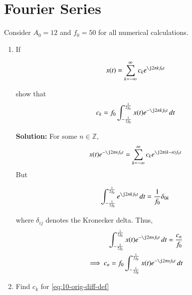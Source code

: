 \documentclass[journal,12pt,twocolumn]{IEEEtran}
\newcommand{\solution}{\noindent \textbf{Solution: }}
\numberwithin{equation}{section}
\numberwithin{figure}{section}
\renewcommand\thesection{\arabic{section}}
\begin{document}
\section{Fourier Series}
Consider $A_0 =12$ and $f_0 = 50$ for all numerical calculations.
\begin{enumerate}[label=\thesection.\arabic*,ref=\thesection.\theenumi]
\item If

\begin{align}
	x(t) = \sum_{k = -\infty}^{\infty}c_ke^{\j2\pi kf_0 t}
\label{eq:one-Z-complex}
\end{align}

show that 
\begin{align}
	c_k = f_0\int_{-\frac{1}{2f_0}}^{\frac{1}{2f_0}}x(t)e^{-\j2\pi kf_0 t}\, dt
\label{eq:one-Z}
\end{align}

\solution For some $n \in \mathbb{Z}$,
\begin{align}
    x(t)e^{-\j2\pi nf_0t} = \sum_{k = -\infty}^{\infty}c_ke^{\j2\pi (k - n)f_0 t}
\end{align}
But

\begin{align}
    \int_{-\frac{1}{2f_0}}^{\frac{1}{2f_0}}e^{\j2\pi kf_0 t}\, dt = 
    \frac{1}{f_0}\delta_{0k}
\end{align}

where $\delta_{ij}$ denotes the Kronecker delta. Thus,
\begin{align}
    \int_{-\frac{1}{2f_0}}^{\frac{1}{2f_0}}x(t)e^{-\j2\pi nf_0 t}\, dt = 
    \frac{c_n}{f_0} \\
    \implies c_n = f_0\int_{-\frac{1}{2f_0}}^{\frac{1}{2f_0}}x(t)e^{-\j2\pi nf_0 t}\, dt 
\end{align}

\item Find $c_k$ for \eqref{eq:10-orig-diff-def}


\end{enumerate}
\end{document}
